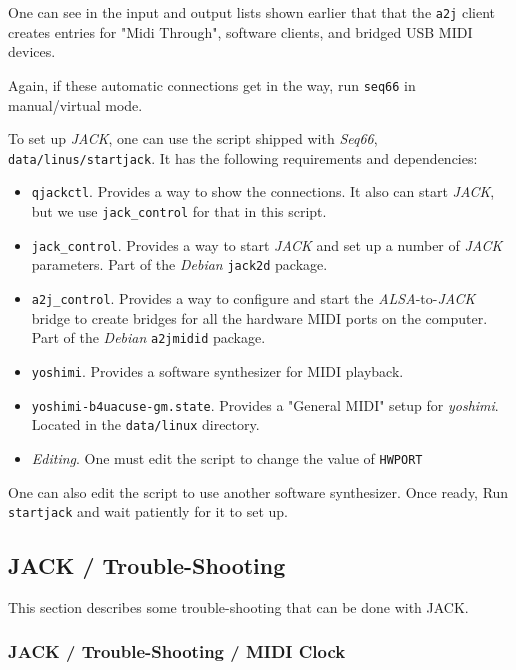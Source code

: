    One can see in the input and output lists shown earlier
   that that the \texttt{a2j} client creates entries for "Midi Through",
   software clients, and bridged USB MIDI devices.

   Again, if these automatic connections get in the way, run \texttt{seq66} in
   manual/virtual mode.

   To set up \textsl{JACK}, one can use the script shipped with
   \textsl{Seq66}, \texttt{data/linus/startjack}.  It has the following
   requirements and dependencies:

   \begin{itemize}
      \item \texttt{qjackctl}.  Provides a way to show the connections. It also
         can start \textsl{JACK}, but we use \texttt{jack\_control} for that in
         this script.
      \item \texttt{jack\_control}.  Provides a way to start \textsl{JACK}
         and set up a number of \textsl{JACK} parameters.
         Part of the \textsl{Debian} \texttt{jack2d} package.
      \item \texttt{a2j\_control}.  Provides a way to configure and start the
         \textsl{ALSA}-to-\textsl{JACK} bridge to create bridges for all the
         hardware MIDI ports on the computer.
         Part of the \textsl{Debian} \texttt{a2jmidid} package.
      \item \texttt{yoshimi}.  Provides a software synthesizer for MIDI
         playback.
      \item \texttt{yoshimi-b4uacuse-gm.state}.  Provides a "General MIDI"
      setup for \textsl{yoshimi}.  Located in the \texttt{data/linux}
      directory.
      \item \textsl{Editing}.  One must edit the script to change the value of
      \texttt{HWPORT}
   \end{itemize}

   One can also edit the script to use another software synthesizer.
   Once ready, 
   Run \texttt{startjack} and wait patiently for it to set up.

\subsection{JACK / Trouble-Shooting}
\label{subsec:jack_testing}

   This section describes some trouble-shooting that can be done with JACK.

\subsubsection{JACK / Trouble-Shooting / MIDI Clock}
\label{subsubsec:jack_testing_midi_clock}

